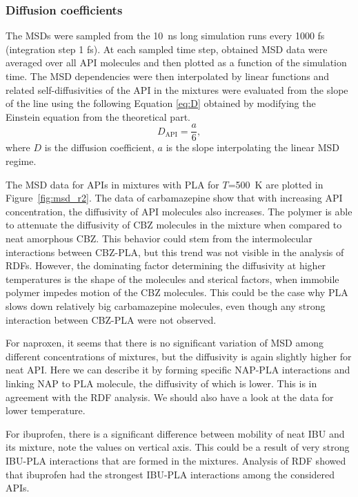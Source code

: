 \newpage
\subsubsection{Diffusion coefficients}

The MSDs were sampled from the 10~ns long simulation runs every 1000 fs (integration step 1 fs). At each sampled time step, obtained MSD data were averaged over all API molecules and then plotted as a function of the simulation time. The MSD dependencies were then interpolated by linear functions and related self-diffusivities of the API in the mixtures were evaluated from the slope of the line using the following Equation \ref{eq:D} obtained by modifying the Einstein equation from the theoretical part.
\vspace{-0.25cm}
\begin{equation}\label{eq:D}
	D_{\text{API}} = \frac{a}{6}, 
\end{equation}
where $D$ is the diffusion coefficient, $a$ is the slope interpolating the linear MSD regime.

The MSD data for APIs in mixtures with PLA for $T$=500~K are plotted in Figure~\ref{fig:msd_r2}. The data of carbamazepine show that with increasing API concentration, the diffusivity of API molecules also increases. The polymer is able to attenuate the diffusivity of CBZ molecules in the mixture when compared to neat amorphous CBZ. This behavior could stem from the intermolecular interactions between CBZ-PLA, but this trend was not visible in the analysis of RDFs. However, the dominating factor determining the diffusivity at higher temperatures is the shape of the molecules and sterical factors, when immobile polymer impedes motion of the CBZ molecules. This could be the case why PLA slows down relatively big carbamazepine molecules, even though any strong interaction between CBZ-PLA were not observed. 

For naproxen, it seems that there is no significant variation of MSD among different concentrations of mixtures, but the diffusivity is again slightly higher for neat API. Here we can describe it by forming specific NAP-PLA interactions and linking NAP to PLA molecule, the diffusivity of which is lower. This is in agreement with the RDF analysis. We should also have a look at the data for lower temperature.

For ibuprofen, there is a significant difference between mobility of neat IBU and its mixture, note the values on vertical axis. This could be a result of very strong IBU-PLA interactions that are formed in the mixtures. Analysis of RDF showed that ibuprofen had the strongest IBU-PLA interactions among the considered APIs.

